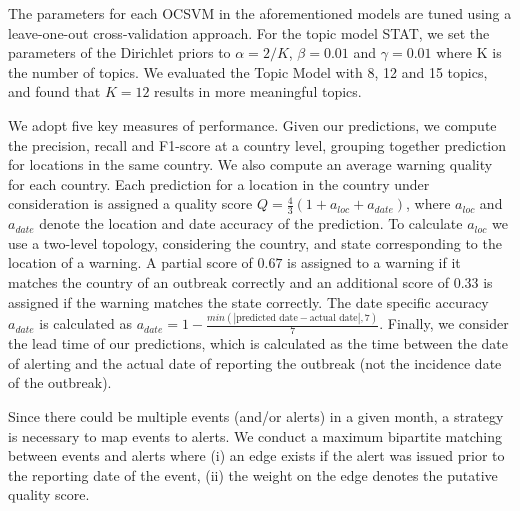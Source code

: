 \documentclass[conference]{IEEEtran}
\newcommand{\model}{{STAT}\xspace} %
\begin{document}
 The parameters for each OCSVM in the aforementioned models are tuned using a leave-one-out cross-validation approach. For the topic model \model, we set the parameters of the Dirichlet priors to $\alpha = 2/K$, $\beta = 0.01$ and $\gamma = 0.01$ where K is the number of topics. We evaluated the Topic Model with 8, 12 and 15 topics, and found that $K=12$ results in more meaningful topics.  

 We adopt five key measures of performance. Given our predictions, we compute the precision, recall and F1-score at a country level, grouping together prediction for locations in the same country. We also compute an average warning quality for each country. Each prediction for a location in the country under consideration is assigned a quality score $Q = \frac{4}{3}(1 + a_{loc} + a_{date})$, where $a_{loc}$ and $a_{date}$ denote the location and date accuracy of the prediction. To calculate $a_{loc}$ we use a two-level topology, considering the country, and state corresponding to the location of a warning. A partial score of $0.67$ is assigned to a warning if it matches the country of an outbreak correctly and an additional score of $0.33$ is assigned if the warning matches the state correctly. The date specific accuracy $a_{date}$ is calculated as $a_{date} = 1 - \frac{min(|\mbox{predicted date} - \mbox{actual date}|,7)}{7}$. Finally, we consider the lead time of our predictions, which is calculated as the time between the date of alerting and the actual date of reporting the outbreak (not the incidence date of the outbreak). 

 Since there could be multiple events (and/or alerts) in a given month, a strategy is necessary to map events to alerts. We conduct a maximum bipartite matching between events and alerts where (i) an edge exists if the alert was issued prior to the reporting date of the event, (ii) the weight on the edge denotes the putative quality score. 
\end{document}

